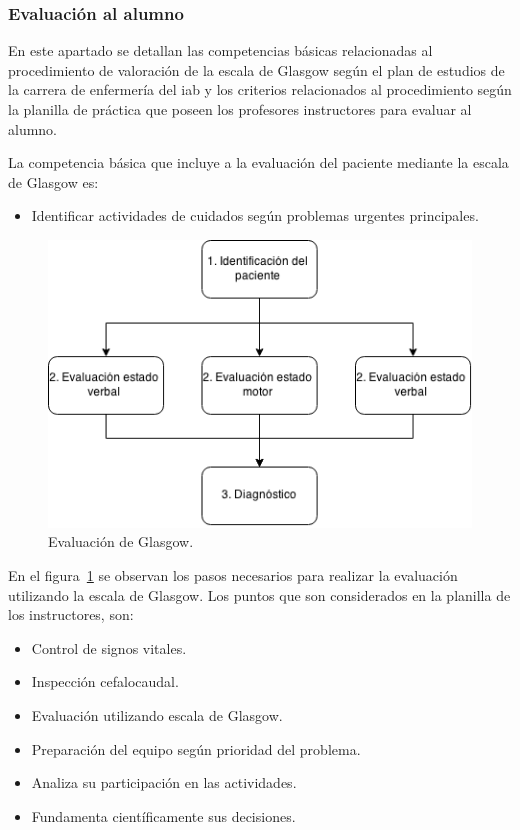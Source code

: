 \subsubsection{Evaluación al alumno}

En este apartado se detallan las competencias básicas relacionadas al procedimiento de 
valoración de la escala de Glasgow según el plan de estudios de la carrera de enfermería del \Gls{iab} y los criterios relacionados al procedimiento 
según la planilla de práctica que poseen los profesores instructores para evaluar al alumno.

La competencia básica que incluye a la evaluación del paciente mediante la
escala de Glasgow es:

\begin{itemize}
\item Identificar actividades de cuidados según problemas urgentes principales.
\end{itemize}

\begin{figure}[H]
\centering
\includegraphics[scale=0.5]{requerimientos/images/glasgow.png}
\caption{Evaluación de Glasgow.}
\label{fig:proc_glasgow}
\end{figure}

En el figura~\ref{fig:proc_glasgow} se observan los pasos necesarios para
realizar la evaluación utilizando la escala de Glasgow\cite{protocolo}. Los puntos que son considerados en la planilla de los instructores, son:


\begin{itemize}
\item Control de signos vitales.
\item Inspección cefalocaudal. 
\item Evaluación utilizando escala de Glasgow.
\item Preparación del equipo según prioridad del problema.
\item Analiza su participación en las actividades.
\item Fundamenta científicamente sus decisiones.
\end{itemize}

